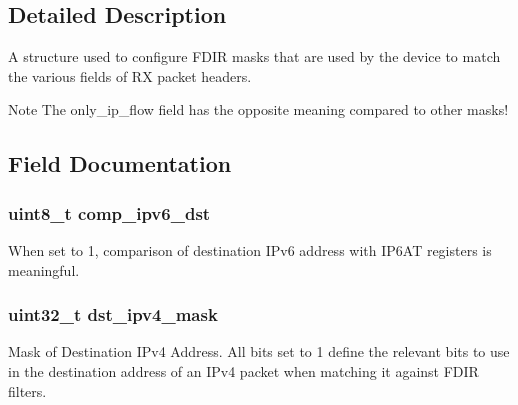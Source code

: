 \subsection{Detailed Description}
A structure used to configure F\+D\+I\+R masks that are used by the device to match the various fields of R\+X packet headers. \begin{DoxyNote}{Note}
The only\+\_\+ip\+\_\+flow field has the opposite meaning compared to other masks! 
\end{DoxyNote}


\subsection{Field Documentation}
\hypertarget{structrte__fdir__masks_a51fb645df14ad44fb4b3c2d22f0e88a9}{}
\subsubsection[{comp\+\_\+ipv6\+\_\+dst}]{\setlength{\rightskip}{0pt plus 5cm}uint8\+\_\+t comp\+\_\+ipv6\+\_\+dst}\label{structrte__fdir__masks_a51fb645df14ad44fb4b3c2d22f0e88a9}
When set to 1, comparison of destination I\+Pv6 address with I\+P6\+A\+T registers is meaningful. \hypertarget{structrte__fdir__masks_af1fa0f87400810fabb92bebe0d27ffba}{}
\subsubsection[{dst\+\_\+ipv4\+\_\+mask}]{\setlength{\rightskip}{0pt plus 5cm}uint32\+\_\+t dst\+\_\+ipv4\+\_\+mask}\label{structrte__fdir__masks_af1fa0f87400810fabb92bebe0d27ffba}
Mask of Destination I\+Pv4 Address. All bits set to 1 define the relevant bits to use in the destination address of an I\+Pv4 packet when matching it against F\+D\+I\+R filters. \hypertarget{structrte__fdir__masks_ab85d32df5f720c359b18cca10aa7cda2}{}
